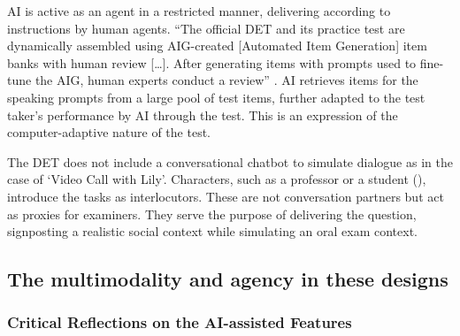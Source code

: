 \documentclass[english]{textolivre}
\begin{document}
\begin{enumerate}[label=\Alph*.]
AI is active as an agent in a restricted manner, delivering according to instructions by human agents. “The official DET and its practice test are dynamically assembled using AIG-created [Automated Item Generation] item banks with human review […]. After generating items with prompts used to fine-tune the AIG, human experts conduct a review” \cite[p. 51]{burstein2025exploring}. AI retrieves items for the speaking prompts from a large pool of test items, further adapted to the test taker’s performance by AI through the test. This is an expression of the computer-adaptive nature of the test.

The DET does not include a conversational chatbot to simulate dialogue as in the case of ‘Video Call with Lily’. Characters, such as a professor or a student (), introduce the tasks as interlocutors. These are not conversation partners but act as proxies for examiners. They serve the purpose of delivering the question, signposting a realistic social context while simulating an oral exam context.

\end{enumerate}



\subsection{The multimodality and agency in these designs}\label{sec-modelo}
\subsubsection{Critical Reflections on the AI-assisted Features}
\end{document}
